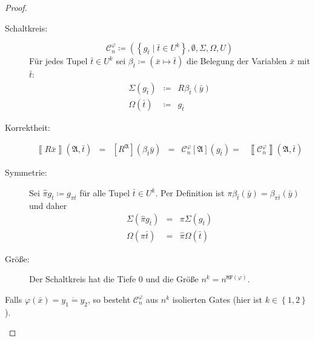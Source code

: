 \begin{proof}
\begin{casenv}
\begin{description}
\item [{Schaltkreis:}] 
\[
\mathcal{C}_{n}^{\varphi}\coloneqq\left(\left\{ g_{\bar{t}}\mid\bar{t}\in U^{k}\right\} ,\emptyset,\Sigma,\Omega,U\right)
\]
Für jedes Tupel $\bar{t}\in U^{k}$ sei $\beta_{\bar{t}}\coloneqq\left(\bar{x}\mapsto\bar{t}\right)$
die Belegung der Variablen $\bar{x}$ mit $\bar{t}$:
\begin{eqnarray*}
\Sigma\left(g_{\bar{t}}\right) & \coloneqq & R\beta_{\bar{t}}\left(\bar{y}\right)\\
\Omega\left(\bar{t}\right) & \coloneqq & g_{\bar{t}}
\end{eqnarray*}
\item [{Korrektheit:}] 
\[
\begin{array}{cccccc}
\left\llbracket R\bar{x}\right\rrbracket \left(\mathfrak{A},\bar{t}\right) & = & \left[R^{\mathfrak{A}}\right]\left(\beta_{\bar{t}}\bar{y}\right) & = & \mathcal{C}_{n}^{\varphi}\left[\mathfrak{A}\right]\left(g_{\bar{t}}\right)= & \left\llbracket \mathcal{C}_{n}^{\varphi}\right\rrbracket \left(\mathfrak{A},\bar{t}\right)\end{array}
\]
\item [{Symmetrie:}] Sei $\hat{\pi}g_{\bar{t}}\coloneqq g_{\pi\bar{t}}$
für alle Tupel $\bar{t}\in U^{k}$. Per Definition ist $\pi\beta_{\bar{t}}\left(\bar{y}\right)=\beta_{\pi\bar{t}}\left(\bar{y}\right)$
und daher 
\begin{eqnarray*}
\Sigma\left(\hat{\pi}g_{\bar{t}}\right) & = & \pi\Sigma\left(g_{\bar{t}}\right)\\
\Omega\left(\pi\bar{t}\right) & = & \hat{\pi}\Omega\left(\bar{t}\right)
\end{eqnarray*}
\item [{Größe:}] Der Schaltkreis hat die Tiefe $0$ und die Größe $n^{k}=n^{\mathtt{MF}\left(\varphi\right)}$.
\end{description}
\item Falls $\varphi\left(\bar{x}\right)=y_{1}\dot{=}y_{2}$, so besteht
$\mathcal{C}_{n}^{\varphi}$ aus $n^{k}$ isolierten Gates (hier ist
$k\in\left\{ 1,2\right\} $).


\end{casenv}
\end{proof}
